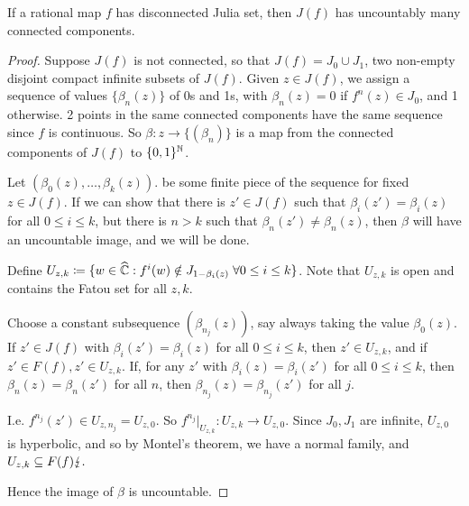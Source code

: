 \documentclass[10pt,a4paper]{article}
\begin{document}
\begin{theorem}
  If a rational map $f$ has disconnected Julia set, then $J(f)$ has uncountably many connected components.
\end{theorem}
\begin{proof}
  Suppose $J(f)$ is not connected, so that $J(f) = J_0 \cup J_1$, two non-empty disjoint compact infinite subsets of $J(f)$. Given $z \in J(f)$, we assign a sequence of values $\{\beta_n(z)\}$ of 0s and 1s, with $\beta_n(z) = 0$ if $f^n(z) \in J_0$, and 1 otherwise. 2 points in the same connected components have the same sequence since $f$ is continuous. So $\beta: z\to \{(\beta_n)\}$ is a map from the connected components of $J(f)$ to $\{0,1\}^{\mathbb{N}}$.

  Let $(\beta_0(z), \ldots, \beta_k(z))$. be some finite piece of the sequence for fixed $z \in J(f)$. If we can show that there is $z' \in J(f)$ such that $\beta_i(z') = \beta_i(z)$ for all $0\leq i\leq k$, but there is $n > k$ such that $\beta_n(z') \neq \beta_n(z)$, then $\beta$ will have an uncountable image, and we will be done.

  Define $U_{z,k} \coloneqq \{w \in \hat\C: f^i(w) \notin J_{1-\beta_i(z)} \forall 0 \leq i \leq k\}$. Note that $U_{z,k}$ is open and contains the Fatou set for all $z, k$.

  Choose a constant subsequence $(\beta_{n_j}(z))$, say always taking the value $\beta_0(z)$. If $z' \in J(f)$ with $\beta_i(z') = \beta_i(z)$ for all $0 \leq i\leq k$, then $z' \in U_{z, k}$, and if $z' \in F(f), z' \in U_{z,k}$. If, for any $z'$ with $\beta_i(z) = \beta_i(z')$ for all $0\leq i\leq k$, then $\beta_n(z)=\beta_n(z')$ for all $n$, then $\beta_{n_j}(z) = \beta_{n_j}(z')$ for all $j$.

  I.e. $f^{n_j}(z') \in U_{z, n_j} = U_{z, 0}$. So $f^{n_j}|_{U_{z,k}} : U_{z,k} \to U_{z,0}$. Since $J_0, J_1$ are infinite, $U_{z,0}$ is hyperbolic, and so by Montel's theorem, we have a normal family, and $U_{z, k} \subseteq F(f) \lightning.$

  Hence the image of $\beta$ is uncountable.
\end{proof}
\end{document}
